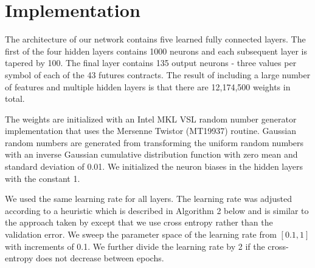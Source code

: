 \documentclass{article}
\begin{document}
\section{Implementation} \label{sect:implementation}

The architecture of our network contains five learned fully connected layers. The first of the four hidden layers contains 1000 neurons and each subsequent layer is tapered by 100. The final layer contains 135 output neurons - three values per symbol of each of the 43 futures contracts.  The result of including a large number of features and multiple hidden layers is that there are 12,174,500 weights in total.

The weights are initialized with an Intel MKL VSL random number generator implementation that uses the Mersenne Twistor (MT19937) routine. Gaussian random numbers are generated from transforming the uniform random numbers with an inverse Gaussian cumulative distribution function with zero mean and standard deviation of 0.01. We initialized the neuron biases in the hidden layers with the constant 1. 

We used the same learning rate for all layers. The learning rate was adjusted according to a heuristic which is described in Algorithm 2 below and is similar to the approach taken by \citet{krizhevsky2012} except that we use cross entropy rather than the validation error. We sweep the parameter space of the learning rate from $[0.1,1]$ with increments of 0.1. We further divide the learning rate by 2 if the cross-entropy does not decrease between epochs.
\end{document}
